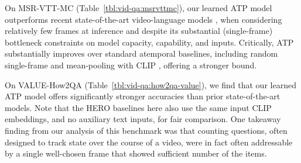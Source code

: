 On MSR-VTT-MC (Table~\ref{tbl:vid-qa:msrvttmc}), our learned ATP model outperforms recent state-of-the-art video-language models \cite{xu2021videoclip,zellersluhessel2021merlot,lei2021less}, when considering relatively few frames at inference and despite its substantial (single-frame) bottleneck constraints on model capacity, capability, and inputs. Critically, ATP substantially improves over standard atemporal baselines, including random single-frame and mean-pooling with CLIP \cite{radford2021learning}, offering a stronger bound.

On VALUE-How2QA (Table~\ref{tbl:vid-qa:how2qa-value}), we find that our learned ATP model offers significantly stronger accuracies than prior state-of-the-art models. Note that the HERO baselines here also use the same input CLIP embeddings, and no auxiliary text inputs, for fair comparison. One takeaway finding from our analysis of this benchmark was that counting questions, often designed to track state over the course of a video, were in fact often addressable by a single well-chosen frame that showed sufficient number of the items.

\begin{table}[bt]
\centering
{}
\caption{\textbf{VideoQA on NExT-QA.} We report accuracies on the overall main dataset and descriptive (D), temporal (T), and causal (C) splits. See Section~\ref{sec:exp:next-qa} for details on the ``Temp[ATP]'' and ``Temp[ATP] + ATP'' models, and details on our ATP subset.}
\vspace{-.5em}
\label{tbl:vid-qa:next-qa}
\end{table}


